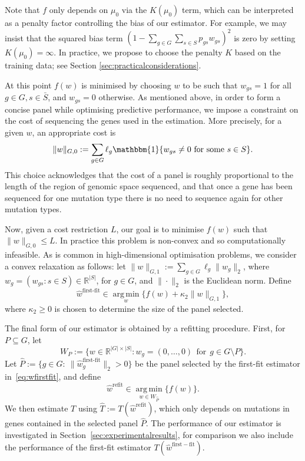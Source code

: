 \documentclass[12pt]{article}
\DeclareMathOperator*{\argmin}{arg\,min}
\begin{document}
Note that $f$ only depends on $\mu_0$ via the $K(\mu_0)$ term, which can be interpreted as a penalty factor controlling the bias of our estimator. For example, we may insist that the squared bias term $(1 - \sum_{g \in G}\sum_{s \in S}  p_{gs}w_{gs})^2$ is zero by setting $K(\mu_0) = \infty$. In practice, we propose to choose the penalty $K$ based on the training data; see Section \ref{sec:practicalconsiderations}. 

At this point $f(w)$ is minimised by choosing $w$ to be such that $w_{gs}= 1$ for all $g\in G, s\in\bar{S}$, and $w_{gs} = 0$ otherwise. As mentioned above, in order to form a concise panel while optimising predictive performance, we impose a constraint on the cost of sequencing the genes used in the estimation. More precisely, for a given $w$, an appropriate cost is
\[
\|w\|_{G,0} := \sum_{g \in G} \ell_g\mathbbm{1}\{w_{gs} \neq 0 \ \mathrm{for \ some \ } s \in S \} .
\]
This choice acknowledges that the cost of a panel is roughly proportional to the length of the region of genomic space sequenced, and that once a gene has been sequenced for one mutation type there is no need to sequence again for other mutation types. 

Now, given a cost restriction $L$, our goal is to minimise $f(w)$ such that $\|w\|_{G,0} \leq L$. In practice this problem is non-convex and so computationally infeasible. As is common in high-dimensional optimisation problems, we consider a convex relaxation as follows: let $\|w\|_{G,1} := \sum_{g \in G} \ell_g \|w_g\|_2$, where $w_g = (w_{gs}: s\in S) \in \mathbb{R}^{|S|}$, for $g \in G$,  and $\|\cdot\|_2$ is the Euclidean norm.  Define
\begin{equation}
    \label{eq:wfirstfit}
\hat{w}^{\text{first-fit}} \in \argmin\limits_{w} \bigl\{ f(w) +\kappa_2\|w\|_{G,1} \bigr\},
\end{equation}
where $\kappa_2 \geq 0$ is chosen to determine the size of the panel selected.

The final form of our estimator is obtained by a refitting procedure. First, for $P\subseteq G$, let
\begin{equation}
    \label{eq:Wp}
W_{P} := \{ w \in \mathbb{R}^{|G| \times |S|} : w_g = (0, \ldots, 0) \ \ \text{for} \ \ g \in G\setminus P \}.
\end{equation}
Let $\hat{P} := \{g \in G: \ \|\hat{w}^{\text{first-fit}}_g\|_2 > 0 \}$ be the panel selected by the first-fit estimator in~\eqref{eq:wfirstfit}, and define  
\begin{equation} 
\label{eq:wrefit}
\hat{w}^{\text{refit}} \in  \argmin\limits_{w \in W_{\hat{P}}} \bigl\{f(w)\bigr\}.
\end{equation}
We then estimate $T$ using $\hat{T} := T(\hat{w}^{\text{refit}})$, which only depends on mutations in genes contained in the selected panel $\hat{P}$.  The performance of our estimator is investigated in Section~\ref{sec:experimentalresults}, for comparison we also include the performance of the first-fit estimator $T(\hat{w}^{\mathrm{first-fit}})$.
\end{document}
